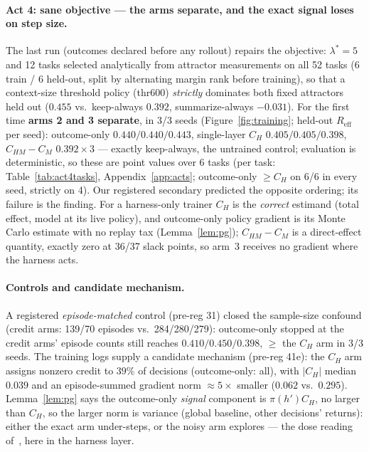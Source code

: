 \documentclass{article}
\theoremstyle{remark}
\begin{document}
\paragraph{Act 4: sane objective --- the arms separate, and the exact
signal loses on step size.} The last run (outcomes declared before any
rollout) repairs the objective: $\lambda^{*} = 5$ and 12 tasks selected
analytically from attractor measurements on all 52 tasks (6 train / 6
held-out, split by alternating margin rank before training), so that a
context-size threshold policy (thr600) \emph{strictly} dominates both
fixed attractors held out ($0.455$ vs.\ keep-always $0.392$,
summarize-always $-0.031$). For the first time \textbf{arms 2 and 3
separate}, in 3/3 seeds (Figure~\ref{fig:training}; held-out
$R_{\text{eff}}$ per seed): outcome-only $0.440 / 0.440 / 0.443$,
single-layer $C_H$ $0.405 / 0.405 / 0.398$, $C_{HM}-C_M$ $0.392 \times
3$ --- exactly keep-always, the untrained control; evaluation is
deterministic, so these are point values over 6 tasks (per task:
Table~\ref{tab:act4tasks}, Appendix~\ref{app:acts}; outcome-only $\geq
C_H$ on 6/6 in every seed, strictly on 4). Our registered secondary
predicted the opposite ordering; its failure is the finding. For a
harness-only trainer $C_H$ is the \emph{correct} estimand (total effect,
model at its live policy), and outcome-only policy gradient is its Monte
Carlo estimate with no replay tax (Lemma~\ref{lem:pg}); $C_{HM}-C_M$ is
a direct-effect quantity, exactly zero at 36/37 slack points, so arm~3
receives no gradient where the harness acts.

\paragraph{Controls and candidate mechanism.} A registered
\emph{episode-matched} control (pre-reg 31) closed the sample-size
confound (credit arms: 139/70 episodes vs.\ 284/280/279): outcome-only
stopped at the credit arms' episode counts still reaches $0.410 / 0.450
/ 0.398$, $\geq$ the $C_H$ arm in 3/3 seeds. The training logs supply a
candidate mechanism (pre-reg 41e): the $C_H$ arm assigns nonzero credit
to $39\%$ of decisions (outcome-only: all), with $|C_H|$ median $0.039$
and an episode-summed gradient norm $\approx 5\times$ smaller ($0.062$
vs.\ $0.295$). Lemma~\ref{lem:pg} says the outcome-only \emph{signal}
component is $\pi(h')C_H$, no larger than $C_H$, so the larger norm is
variance (global baseline, other decisions' returns): either the exact
arm under-steps, or the noisy arm explores --- the dose reading
of~\citet{audit2026}, here in the harness layer.
\end{document}
